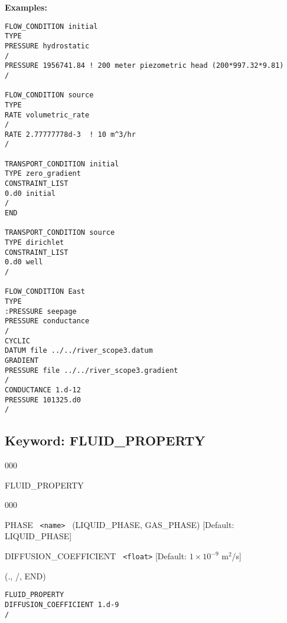\documentclass[12pt]{article}
\begin{document}
\bigskip

{\noindent\bf Examples:}
\begin{verbatim}
FLOW_CONDITION initial
TYPE
PRESSURE hydrostatic
/
PRESSURE 1956741.84 ! 200 meter piezometric head (200*997.32*9.81)
/

FLOW_CONDITION source
TYPE
RATE volumetric_rate
/
RATE 2.77777778d-3  ! 10 m^3/hr
/

TRANSPORT_CONDITION initial
TYPE zero_gradient
CONSTRAINT_LIST
0.d0 initial
/
END

TRANSPORT_CONDITION source
TYPE dirichlet
CONSTRAINT_LIST
0.d0 well
/

FLOW_CONDITION East
TYPE
:PRESSURE seepage
PRESSURE conductance
/
CYCLIC
DATUM file ../../river_scope3.datum
GRADIENT
PRESSURE file ../../river_scope3.gradient
/
CONDUCTANCE 1.d-12
PRESSURE 101325.d0
/
\end{verbatim}


\newpage
\protect\hypertarget{target_fluid_property}{}

\subsection{Keyword: FLUID\_PROPERTY}


\begin{deflist}{000}
\item[FLUID\_PROPERTY]~
\begin{deflist}{000}
\item[PHASE] \ {\tt <name>} \ (LIQUID\_PHASE, GAS\_PHASE) [Default: LIQUID\_PHASE]
\item[DIFFUSION\_COEFFICIENT] \ {\tt <float>} [Default: $1\times 10^{-9}$ m$^2$/s]
\end{deflist}
\item[(., /, END)]
\end{deflist}


\begin{verbatim}
FLUID_PROPERTY
DIFFUSION_COEFFICIENT 1.d-9
/
\end{verbatim}


\newpage
\protect\hypertarget{target_grid}{}
\end{document}
